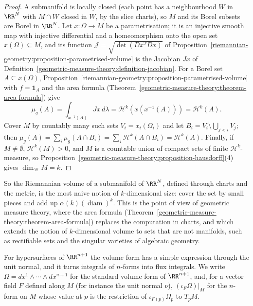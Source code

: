 \begin{proof}
A submanifold is locally closed (each point has a neighbourhood $W$ in $\RR^N$ with $M \cap W$ closed in $W$, by the slice charts), so $M$ and its Borel subsets are Borel in $\RR^N$. Let
$x \colon \Omega \to M$ be a parametrisation; it is an injective smooth map with injective differential and a homeomorphism onto the open set $x(\Omega) \subseteq M$, and its function
$\mathcal{J} = \sqrt{\det(Dx^TDx)}$ of Proposition~\ref{riemannian-geometry:proposition-parametrised-volume} is the Jacobian $Jx$ of Definition~\ref{geometric-measure-theory:definition-jacobian}. For a
Borel set $A \subseteq x(\Omega)$, Proposition~\ref{riemannian-geometry:proposition-parametrised-volume} with $f = \mathbf{1}_A$ and the area formula
(Theorem~\ref{geometric-measure-theory:theorem-area-formula}) give
\[
\mu_g(A) = \int_{x^{-1}(A)}Jx\,d\lambda = \mathcal{H}^k(x(x^{-1}(A))) = \mathcal{H}^k(A).
\]
Cover $M$ by countably many such sets $V_i = x_i(\Omega_i)$ and let $B_i = V_i \setminus \bigcup_{j < i}V_j$; then $\mu_g(A) = \sum_i\mu_g(A \cap B_i) = \sum_i\mathcal{H}^k(A \cap B_i) =
\mathcal{H}^k(A)$. Finally, if $M \neq \emptyset$, $\mathcal{H}^k(M) > 0$, and $M$ is a countable union of compact sets of finite $\mathcal{H}^k$-measure, so
Proposition~\ref{geometric-measure-theory:proposition-hausdorff}(4) gives $\dim_{\mathcal{H}}M = k$.
\end{proof}

So the Riemannian volume of a submanifold of $\RR^N$, defined through charts and the metric, is the most naive notion of $k$-dimensional size: cover the set by small pieces and add up
$\alpha(k)(\operatorname{diam})^k$. This is the point of view of geometric measure theory, where the area formula (Theorem~\ref{geometric-measure-theory:theorem-area-formula}) replaces the computation in
charts, and which extends the notion of $k$-dimensional volume to sets that are not manifolds, such as rectifiable sets and the singular varieties of algebraic geometry.

For hypersurfaces of $\RR^{n+1}$ the volume form has a simple expression through the unit normal, and it turns integrals of $n$-forms into flux integrals. We write
$\Omega = dx^1 \wedge \cdots \wedge dx^{n+1}$ for the standard volume form of $\RR^{n+1}$, and, for a vector field $F$ defined along $M$ (for instance the unit normal
$\nu$), $(\iota_F\Omega)|_M$ for the $n$-form on $M$ whose value at $p$ is the restriction of $\iota_{F(p)}\Omega_p$ to $T_pM$.


